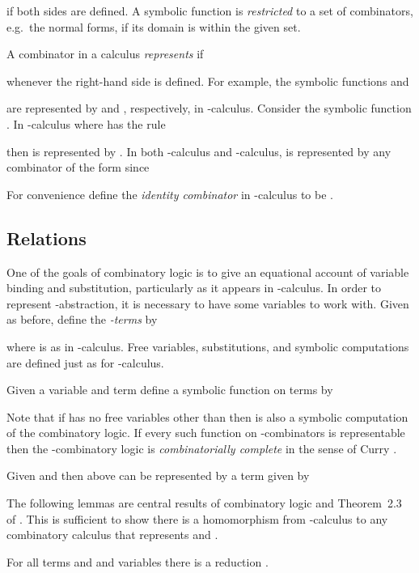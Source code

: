 \documentclass{llncs}
\begin{document}
if both sides are defined.  A symbolic function is {\em restricted} to
a set of combinators, e.g.\ the normal forms, if its domain is within
the given set.

A combinator  in a calculus {\em represents}  if

whenever the right-hand side is defined.  For example, the symbolic
functions
 and

are represented by  and , respectively, 
in -calculus.
  Consider the
symbolic function
. 
In -calculus where  has the rule

then  is represented by . In both -calculus and
-calculus,  is represented by any combinator of the
form  since

For convenience define the {\em identity combinator}  in -calculus to be .


\subsection{Relations}
\label{sec:lambda=SK}



One of the goals of combinatory logic is to give an equational account
of variable binding and substitution, particularly as it appears in
-calculus.
In order to represent -abstraction, it is necessary to have some
variables to work with. Given  as before, define the
{\em -terms} by 

where  is as in -calculus.
Free variables, substitutions, and symbolic computations are defined
just as for -calculus.

Given a variable  and term  define a symbolic function  on terms by 

Note that if  has no free variables other than  then 
is also a symbolic computation of the combinatory logic.  If every
such function  on -combinators is representable then the
-combinatory logic is {\em combinatorially complete} in the
sense of Curry \cite[p.~5]{Curry58combinatorylogic}.


Given  and  then  above can be
represented by a term  given by



The following lemmas are central results of combinatory logic
\cite{Curry58combinatorylogic} and Theorem~2.3 of \cite{JayGW11}. This is sufficient
to show there is a homomorphism from -calculus to any combinatory calculus 
that represents  and .

\begin{lemma}
\label{lem:beta*}
For all terms  and  and variables  there is a reduction
.
\end{lemma}
\end{document}
